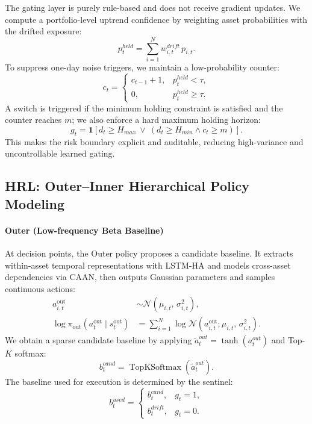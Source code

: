 \documentclass[letterpaper]{article} %
\begin{document}
The gating layer is purely rule-based and does not receive gradient updates.
We compute a portfolio-level uptrend confidence by weighting asset probabilities with the drifted exposure:
\begin{equation}
p_t^{held}=\sum_{i=1}^{N}w^{drift}_{i,t}\,p_{i,t}.
\end{equation}
To suppress one-day noise triggers, we maintain a low-probability counter:
\begin{equation}
c_t=
\begin{cases}
c_{t-1}+1,& p_t^{held}<\tau,\\
0,& p_t^{held}\ge \tau.
\end{cases}
\end{equation}
A switch is triggered if the minimum holding constraint is satisfied and the counter reaches $m$; we also enforce
a hard maximum holding horizon:
\begin{equation}
g_t=\mathbf{1}\!\left[d_t\ge H_{max}\ \lor\ (d_t\ge H_{min}\land c_t\ge m)\right].
\end{equation}
This makes the risk boundary explicit and auditable, reducing high-variance and uncontrollable learned gating.

\subsection{HRL: Outer--Inner Hierarchical Policy Modeling}
\label{sec:hrl}

\paragraph{Outer (Low-frequency Beta Baseline)}
At decision points, the Outer policy proposes a candidate baseline. It extracts within-asset temporal
representations with LSTM-HA and models cross-asset dependencies via CAAN, then outputs Gaussian parameters and
samples continuous actions:
\begin{equation}
\begin{aligned}
a^{\mathrm{out}}_{i,t}
&\sim \mathcal{N}\!\left(\mu_{i,t},\,\sigma_{i,t}^2\right),\\
\log \pi_{\mathrm{out}}\!\left(a_t^{\mathrm{out}} \mid s_t^{\mathrm{out}}\right)
&= \sum_{i=1}^{N}
\log \mathcal{N}\!\left(a^{\mathrm{out}}_{i,t};
\mu_{i,t},\,\sigma_{i,t}^2\right).
\end{aligned}
\end{equation}
We obtain a sparse candidate baseline by applying $\tilde a_t^{out}=\tanh(a_t^{out})$ and Top-$K$ softmax:
\begin{equation}
b_t^{cand}=\operatorname{TopKSoftmax}(\tilde a_t^{out}).
\end{equation}
The baseline used for execution is determined by the sentinel:
\begin{equation}
b_t^{used}=
\begin{cases}
b_t^{cand}, & g_t=1,\\
b_t^{drift}, & g_t=0.
\end{cases}
\end{equation}
\end{document}

